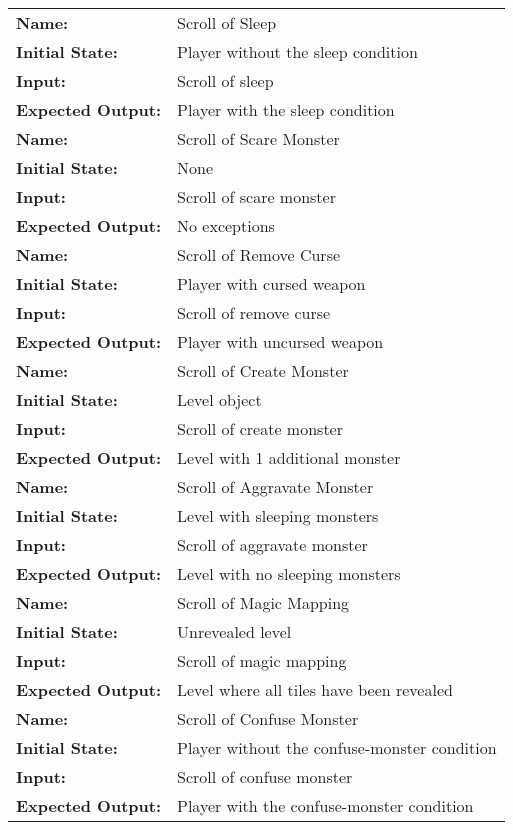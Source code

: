 \documentclass[12pt, titlepage]{article}
\begin{document}
\begin{center}
\begin{longtable}{ l | p{10cm} }
				\hline
				\textbf{Name:} & Scroll of Sleep\\
				\textbf{Initial State:} & Player without the sleep condition\\
				\textbf{Input:} & Scroll of sleep\\
				\textbf{Expected Output:} & Player with the sleep condition\\
				\hline
				\textbf{Name:} & Scroll of Scare Monster\\
				\textbf{Initial State:} & None\\
				\textbf{Input:} & Scroll of scare monster\\
				\textbf{Expected Output:} & No exceptions\\
				\hline
				\textbf{Name:} & Scroll of Remove Curse\\
				\textbf{Initial State:} & Player with cursed weapon\\
				\textbf{Input:} & Scroll of remove curse\\
				\textbf{Expected Output:} & Player with uncursed weapon\\
				\hline
				\textbf{Name:} & Scroll of Create Monster\\
				\textbf{Initial State:} & Level object\\
				\textbf{Input:} & Scroll of create monster\\
				\textbf{Expected Output:} & Level with 1 additional monster\\
				\hline
				\textbf{Name:} & Scroll of Aggravate Monster\\
				\textbf{Initial State:} & Level with sleeping monsters\\
				\textbf{Input:} & Scroll of aggravate monster\\
				\textbf{Expected Output:} & Level with no sleeping monsters\\
				\hline
				\textbf{Name:} & Scroll of Magic Mapping\\
				\textbf{Initial State:} & Unrevealed level\\
				\textbf{Input:} & Scroll of magic mapping\\
				\textbf{Expected Output:} & Level where all tiles have been revealed\\
				\hline
				\textbf{Name:} & Scroll of Confuse Monster\\
				\textbf{Initial State:} & Player without the confuse-monster condition\\
				\textbf{Input:} & Scroll of confuse monster\\
				\textbf{Expected Output:} & Player with the confuse-monster condition\\

\end{longtable}
\end{center}
\end{document}
